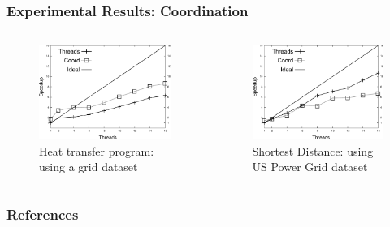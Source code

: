 \documentclass{beamer}
\begin{document}
\begin{frame}[fragile]
   \frametitle{Experimental Results: Coordination}
   \begin{columns}[t]
      \begin{figure}[b]
         \includegraphics[width=\textwidth]{coord/speedup_heat-transfer-80.pdf}
         \caption{Heat transfer program: using a grid dataset}
      \end{figure}
      \begin{figure}[b]
         \includegraphics[width=\textwidth]{coord/speedup_shortest-uspowergrid.pdf}
         \caption{Shortest Distance: using US Power Grid dataset}
      \end{figure}
   \end{columns}
\end{frame}

\begin{frame}[allowframebreaks]
  \frametitle{References}
  
  
\end{frame}
\end{document}
